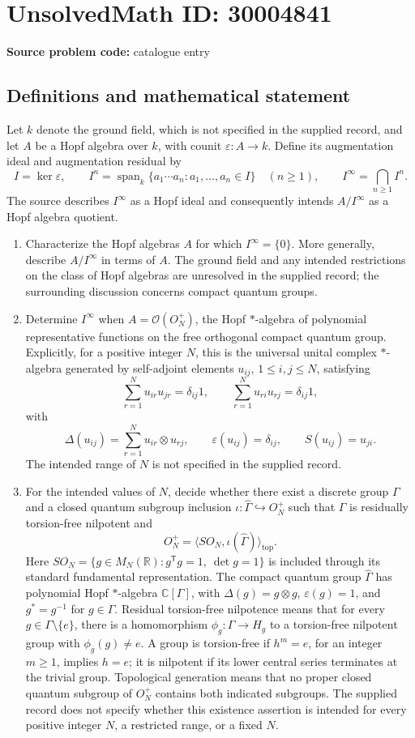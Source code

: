 \documentclass[11pt]{article}
\newcommand{\R}{\mathbb{R}}
\newcommand{\C}{\mathbb{C}}
\begin{document}
\section*{UnsolvedMath ID: 30004841}
\textbf{Source problem code:} catalogue entry
\subsection{Definitions and mathematical statement}
Let \(k\) denote the ground field, which is not specified in the supplied record, and let \(A\) be a Hopf algebra over \(k\), with counit \(\varepsilon:A\to k\). Define its augmentation ideal and augmentation residual by
\[
I=\ker\varepsilon,\qquad I^n=\operatorname{span}_k\{a_1\cdots a_n:a_1,\ldots,a_n\in I\}\quad(n\geq1),\qquad I^\infty=\bigcap_{n\geq1}I^n.
\]
The source describes \(I^\infty\) as a Hopf ideal and consequently intends \(A/I^\infty\) as a Hopf algebra quotient.

\begin{enumerate}
\item Characterize the Hopf algebras \(A\) for which \(I^\infty=\{0\}\). More generally, describe \(A/I^\infty\) in terms of \(A\). The ground field and any intended restrictions on the class of Hopf algebras are unresolved in the supplied record; the surrounding discussion concerns compact quantum groups.
\item Determine \(I^\infty\) when \(A=\mathcal O(O_N^+)\), the Hopf \(*\)-algebra of polynomial representative functions on the free orthogonal compact quantum group. Explicitly, for a positive integer \(N\), this is the universal unital complex \(*\)-algebra generated by self-adjoint elements \(u_{ij}\), \(1\leq i,j\leq N\), satisfying
\[
\sum_{r=1}^N u_{ir}u_{jr}=\delta_{ij}1,\qquad
\sum_{r=1}^N u_{ri}u_{rj}=\delta_{ij}1,
\]
with
\[
\Delta(u_{ij})=\sum_{r=1}^N u_{ir}\otimes u_{rj},\qquad
\varepsilon(u_{ij})=\delta_{ij},\qquad S(u_{ij})=u_{ji}.
\]
The intended range of \(N\) is not specified in the supplied record.
\item For the intended values of \(N\), decide whether there exist a discrete group \(\Gamma\) and a closed quantum subgroup inclusion \(\iota:\widehat\Gamma\hookrightarrow O_N^+\) such that \(\Gamma\) is residually torsion-free nilpotent and
\[
O_N^+=\langle SO_N,\iota(\widehat\Gamma)\rangle_{\mathrm{top}}.
\]
Here \(SO_N=\{g\in M_N(\R):g^{\mathsf T}g=1,\ \det g=1\}\) is included through its standard fundamental representation. The compact quantum group \(\widehat\Gamma\) has polynomial Hopf \(*\)-algebra \(\C[\Gamma]\), with \(\Delta(g)=g\otimes g\), \(\varepsilon(g)=1\), and \(g^*=g^{-1}\) for \(g\in\Gamma\). Residual torsion-free nilpotence means that for every \(g\in\Gamma\setminus\{e\}\), there is a homomorphism \(\phi_g:\Gamma\to H_g\) to a torsion-free nilpotent group with \(\phi_g(g)\ne e\). A group is torsion-free if \(h^m=e\), for an integer \(m\geq1\), implies \(h=e\); it is nilpotent if its lower central series terminates at the trivial group. Topological generation means that no proper closed quantum subgroup of \(O_N^+\) contains both indicated subgroups. The supplied record does not specify whether this existence assertion is intended for every positive integer \(N\), a restricted range, or a fixed \(N\).
\end{enumerate}
\end{document}
